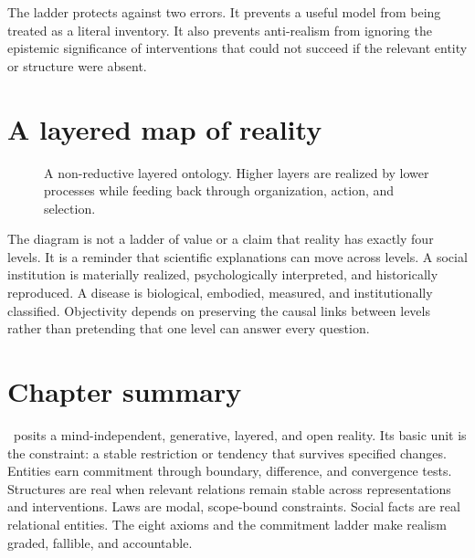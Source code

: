 The ladder protects against two errors. It prevents a useful model from being
treated as a literal inventory. It also prevents anti-realism from ignoring
the epistemic significance of interventions that could not succeed if the
relevant entity or structure were absent.

\section{A layered map of reality}

\begin{figure}[ht]
\centering
{}
\caption{A non-reductive layered ontology. Higher layers are realized by lower
processes while feeding back through organization, action, and selection.}
\label{fig:ontology-layers}
\end{figure}

The diagram is not a ladder of value or a claim that reality has exactly four
levels. It is a reminder that scientific explanations can move across levels.
A social institution is materially realized, psychologically interpreted, and
historically reproduced. A disease is biological, embodied, measured, and
institutionally classified. Objectivity depends on preserving the causal links
between levels rather than pretending that one level can answer every question.

\section*{Chapter summary}

\RCR\ posits a mind-independent, generative, layered, and open reality. Its
basic unit is the constraint: a stable restriction or tendency that survives
specified changes. Entities earn commitment through boundary, difference, and
convergence tests. Structures are real when relevant relations remain stable
across representations and interventions. Laws are modal, scope-bound
constraints. Social facts are real relational entities. The eight axioms and
the commitment ladder make realism graded, fallible, and accountable.

